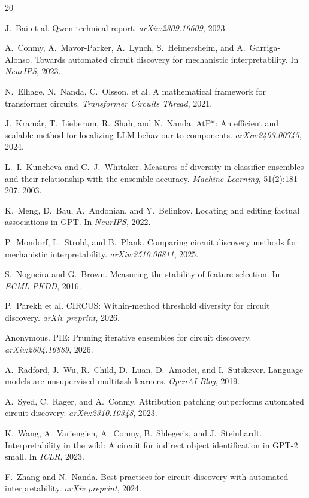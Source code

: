 \documentclass[11pt,a4paper]{article}
\begin{document}
\begin{thebibliography}{20}

J.~Bai et al.
Qwen technical report.
{\em arXiv:2309.16609}, 2023.

A.~Conmy, A.~Mavor-Parker, A.~Lynch, S.~Heimersheim, and A.~Garriga-Alonso.
Towards automated circuit discovery for mechanistic interpretability.
In {\em NeurIPS}, 2023.

N.~Elhage, N.~Nanda, C.~Olsson, et al.
A mathematical framework for transformer circuits.
{\em Transformer Circuits Thread}, 2021.

J.~Kram{\'a}r, T.~Lieberum, R.~Shah, and N.~Nanda.
AtP*: An efficient and scalable method for localizing LLM behaviour to components.
{\em arXiv:2403.00745}, 2024.

L.~I.~Kuncheva and C.~J.~Whitaker.
Measures of diversity in classifier ensembles and their relationship with the ensemble accuracy.
{\em Machine Learning}, 51(2):181--207, 2003.

K.~Meng, D.~Bau, A.~Andonian, and Y.~Belinkov.
Locating and editing factual associations in GPT.
In {\em NeurIPS}, 2022.

P.~Mondorf, L.~Strobl, and B.~Plank.
Comparing circuit discovery methods for mechanistic interpretability.
{\em arXiv:2510.06811}, 2025.

S.~Nogueira and G.~Brown.
Measuring the stability of feature selection.
In {\em ECML-PKDD}, 2016.

P.~Parekh et al.
CIRCUS: Within-method threshold diversity for circuit discovery.
{\em arXiv preprint}, 2026.

Anonymous.
PIE: Pruning iterative ensembles for circuit discovery.
{\em arXiv:2604.16889}, 2026.

A.~Radford, J.~Wu, R.~Child, D.~Luan, D.~Amodei, and I.~Sutskever.
Language models are unsupervised multitask learners.
{\em OpenAI Blog}, 2019.

A.~Syed, C.~Rager, and A.~Conmy.
Attribution patching outperforms automated circuit discovery.
{\em arXiv:2310.10348}, 2023.

K.~Wang, A.~Variengien, A.~Conmy, B.~Shlegeris, and J.~Steinhardt.
Interpretability in the wild: A circuit for indirect object identification in GPT-2 small.
In {\em ICLR}, 2023.

F.~Zhang and N.~Nanda.
Best practices for circuit discovery with automated interpretability.
{\em arXiv preprint}, 2024.

\end{thebibliography}
\end{document}
